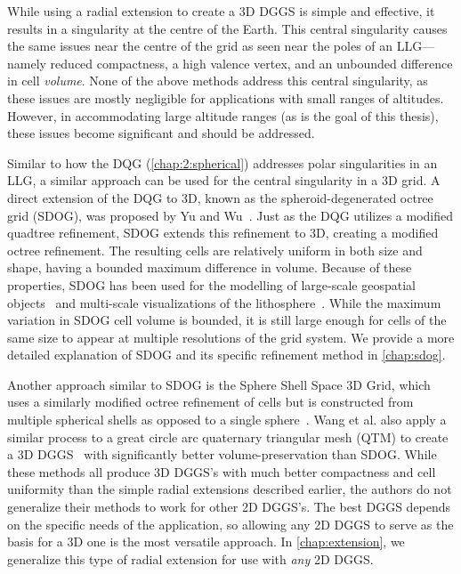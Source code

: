 While using a radial extension to create a 3D DGGS is simple and effective, it results in a singularity at the centre of the Earth.
This central singularity causes the same issues near the centre of the grid as seen near the poles of an LLG---namely reduced compactness, a high valence vertex, and an unbounded difference in cell \textit{volume}.
None of the above methods address this central singularity, as these issues are mostly negligible for applications with small ranges of altitudes.
However, in accommodating large altitude ranges (as is the goal of this thesis), these issues become significant and should be addressed.


Similar to how the DQG (\cref{chap:2:spherical}) addresses polar singularities in an LLG, a similar approach can be used for the central singularity in a 3D grid.
A direct extension of the DQG to 3D, known as the spheroid-degenerated octree grid (SDOG), was proposed by Yu and Wu~\cite{yu2009sdog}.
Just as the DQG utilizes a modified quadtree refinement, SDOG extends this refinement to 3D, creating a modified octree refinement.
The resulting cells are relatively uniform in both size and shape, having a bounded maximum difference in volume.
Because of these properties, SDOG has been used for the modelling of large-scale geospatial objects~\cite{yu2012large-scale} and multi-scale visualizations of the lithosphere~\cite{yu2012lithosphere}.
While the maximum variation in SDOG cell volume is bounded, it is still large enough for cells of the same size to appear at multiple resolutions of the grid system.
We provide a more detailed explanation of SDOG and its specific refinement method in \cref{chap:sdog}.


Another approach similar to SDOG is the Sphere Shell Space 3D Grid, which uses a similarly modified octree refinement of cells but is constructed from multiple spherical shells as opposed to a single sphere~\cite{gang2013sphere}.
Wang et al. also apply a similar process to a great circle arc quaternary triangular mesh (QTM) to create a 3D DGGS~\cite{wang2013global} with significantly better volume-preservation than SDOG.
While these methods all produce 3D DGGS's with much better compactness and cell uniformity than the simple radial extensions described earlier, the authors do not generalize their methods to work for other 2D DGGS's.
The best DGGS depends on the specific needs of the application, so allowing any 2D DGGS to serve as the basis for a 3D one is the most versatile approach.
In \cref{chap:extension}, we generalize this type of radial extension for use with \textit{any} 2D DGGS.


